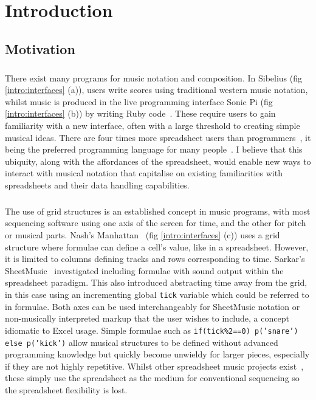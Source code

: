 
\chapter{Introduction}

\section{Motivation}

\paragraph{} There exist many programs for music notation and composition. In Sibelius (fig \ref{intro:interfaces} (a)), users write scores using traditional western music notation, whilst music is produced in the live programming interface Sonic Pi (fig \ref{intro:interfaces} (b)) by writing Ruby code~\cite{aaron:pi}. These require users to gain familiarity with a new interface, often with a large threshold to creating simple musical ideas. There are four times more spreadsheet users than programmers~\cite{scaffidi:estimating}, it being the preferred programming language for many people~\cite{blackwell:functions}. I believe that this ubiquity, along with the affordances of the spreadsheet, would enable new ways to interact with musical notation that capitalise on existing familiarities with spreadsheets and their data handling capabilities.

\paragraph{} The use of grid structures is an established concept in music programs, with most sequencing software using one axis of the screen for time, and the other for pitch or musical parts. Nash's Manhattan~\cite{nash:manhattan} (fig \ref{intro:interfaces} (c)) uses a grid structure where formulae can define a cell's value, like in a spreadsheet. However, it is limited to columns defining tracks and rows corresponding to time. Sarkar's SheetMusic~\cite{sarkar:sheetmusic} investigated including formulae with sound output within the spreadsheet paradigm. This also introduced abstracting time away from the grid, in this case using an incrementing global \texttt{tick} variable which could be referred to in formulae. Both axes can be used interchangeably for SheetMusic notation or non-musically interpreted markup that the user wishes to include, a concept idiomatic to Excel usage. Simple formulae such as \texttt{if(tick\%2==0) p('snare') else p('kick')} allow musical structures to be defined without advanced programming knowledge but quickly become unwieldy for larger pieces, especially if they are not highly repetitive. Whilst other spreadsheet music projects exist~\cite{hackaday:spreadsheet}, these simply use the spreadsheet as the medium for conventional sequencing so the spreadsheet flexibility is lost.

